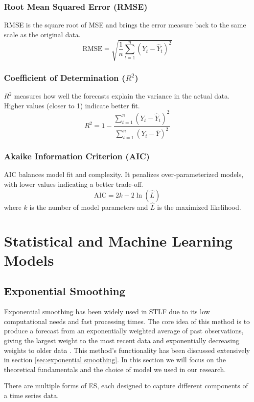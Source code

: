 \subsubsection{Root Mean Squared Error (RMSE)} 
RMSE is the square root of MSE and brings the error measure back to the same scale as the original data.  
\[
\text{RMSE} = \sqrt{\frac{1}{n}\sum_{t=1}^{n} (Y_t - \hat{Y}_t)^2}
\tag{8}
\]

\subsubsection{Coefficient of Determination ($R^2$)} 
$R^2$ measures how well the forecasts explain the variance in the actual data. Higher values (closer to 1) indicate better fit.  
\[
R^2 = 1 - \frac{\sum_{t=1}^{n} (Y_t - \hat{Y}_t)^2}{\sum_{t=1}^{n} (Y_t - \bar{Y})^2}
\tag{9}
\]

\subsubsection{Akaike Information Criterion (AIC)} 
AIC balances model fit and complexity. It penalizes over-parameterized models, with lower values indicating a better trade-off.  
\[
\text{AIC} = 2k - 2\ln(\hat{L})
\tag{10}
\]
where $k$ is the number of model parameters and $\hat{L}$ is the maximized likelihood.



\section{Statistical and Machine Learning Models}
\subsection{Exponential Smoothing}

Exponential smoothing has been widely used in STLF due to its low computational needs and fast processing times. The core idea of this method is to produce a forecast from an exponentially weighted average of past observations, giving the largest weight to the most recent data and exponentially decreasing weights to older data \cite{ostertagova2011simple}. This method's functionality has been discussed extensively in section \ref{sec:exponential smoothing}. In this section we will focus on the theoretical fundamentals and the choice of model we used in our research.  

There are multiple forms of ES, each designed to capture different components of a time series data.
